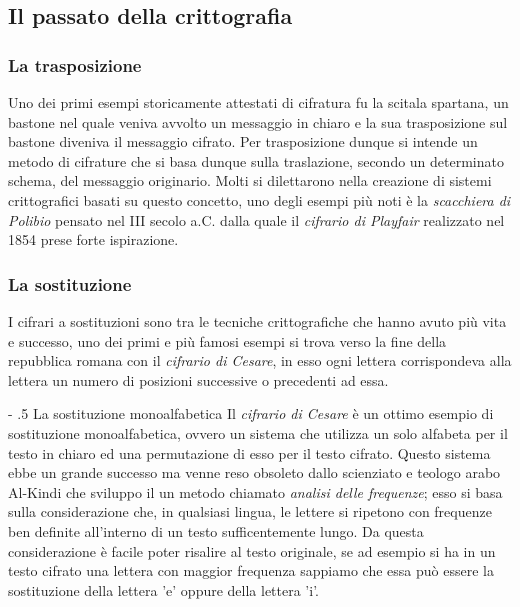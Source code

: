 \documentclass[a4paper, 12pt]{article}
\makeatletter
\renewcommand\paragraph{%
        \@startsection{paragraph}{4}{0mm}%
           {-\baselineskip}%
           {.5\baselineskip}%
           {\normalfont\normalsize\bfseries}}
\makeatother
\begin{document}
\subsection{Il passato della crittografia}
\subsubsection{La trasposizione}
Uno dei primi esempi storicamente attestati di cifratura fu la scitala spartana, un bastone nel quale veniva avvolto un messaggio in chiaro e la sua trasposizione sul bastone diveniva il messaggio cifrato. Per trasposizione dunque si intende un metodo di cifrature che si basa dunque sulla traslazione, secondo un determinato schema, del messaggio originario.\newline
Molti si dilettarono nella creazione di sistemi crittografici basati su questo concetto, uno degli esempi più noti è la \textit{scacchiera di Polibio} pensato nel III secolo a.C. dalla quale il \textit{cifrario di Playfair} realizzato nel 1854 prese forte ispirazione.
\subsubsection{La sostituzione}
I cifrari a sostituzioni sono tra le tecniche crittografiche che hanno avuto più vita e successo, uno dei primi e più famosi esempi si trova verso la fine della repubblica romana con il \textit{cifrario di Cesare}, in esso ogni lettera corrispondeva alla lettera un numero di posizioni successive o precedenti ad essa. 

\paragraph{La sostituzione monoalfabetica}
Il \textit{cifrario di Cesare} è un ottimo esempio di sostituzione monoalfabetica, ovvero un sistema che utilizza un solo alfabeta per il testo in chiaro ed una permutazione di esso per il testo cifrato.\newline
Questo sistema ebbe un grande successo ma venne reso obsoleto dallo scienziato e teologo arabo Al-Kindi che sviluppo il un metodo chiamato \textit{analisi delle frequenze}; esso si basa sulla considerazione che, in qualsiasi lingua, le lettere si ripetono con frequenze ben definite all'interno di un testo sufficentemente lungo. Da questa considerazione è facile poter risalire al testo originale, se ad esempio si ha in un testo cifrato una lettera con maggior frequenza sappiamo che essa può essere la sostituzione della lettera 'e' oppure della lettera 'i'.
\end{document}
